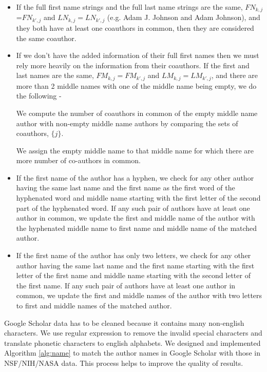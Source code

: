  \begin{itemize}
 \item If the full first name strings and the full last name strings are the same, $FN_{k,j}$=$FN_{k',j}$ and $LN_{k,j} = LN_{k',j}$ (e.g. Adam J. Johnson and Adam Johnson), and they both have at least one coauthors in common,  then they are considered the same coauthor. 
 \item If we don't have the added information of their full first names then we must rely more heavily on the information from their coauthors. If the first and last names are the same, $FM_{k,j}=FM_{k',j}$ and $LM_{k,j}=LM_{k',j}$, and there are more than 2 middle names with one of the middle name being empty, we do the following -
 
 We compute the number of coauthors in common of the empty middle name author with non-empty middle name authors by comparing the sets of coauthors, $\{j\}$.%
 
 We assign the empty middle name to that middle name for which there are more number of co-authors in common.
 
 \item If the first name of the author has a hyphen, we check for any other author having the same last name and the first name as the first word of the hyphenated word and middle name starting with the first letter of the second part of the hyphenated word. If any such pair of authors have at least one author in common, we update the first and middle name of the author with the hyphenated middle name to first name and middle name of the matched author.


\item If the first name of the author has only two letters, we check for any other author having the same last name and the first name starting with the first letter of the first name and middle name starting with the second letter of the first name. If any such pair of authors have at least one author in common, we update the first and middle names of the author with two letters to first and middle names of the matched author.
  
\end{itemize}
Google Scholar data has to be cleaned because it contains many non-english characters. We use regular expression to remove the invalid special characters and translate phonetic characters to english alphabets. We designed and implemented Algorithm \ref{alg:name} to match the author names in Google Scholar with those in NSF/NIH/NASA data. This process helps to improve the quality of results. 


